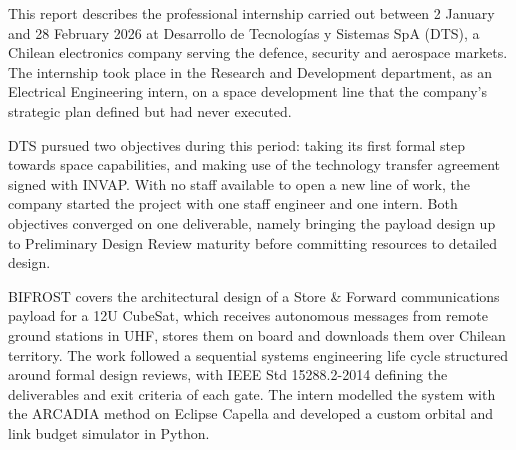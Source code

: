 %



This report describes the professional internship carried out between 2 January
and 28 February 2026 at Desarrollo de Tecnologías y Sistemas SpA (DTS), a
Chilean electronics company serving the defence, security and aerospace markets.
The internship took place in the Research and Development department, as an
Electrical Engineering intern, on a space development line that the
company's strategic plan defined but had never executed.

DTS pursued two objectives during this period: taking its first formal step
towards space capabilities, and making use of the technology transfer agreement
signed with INVAP. With no staff available to open a new line of work, the
company started the project with one staff engineer and one intern. Both objectives converged on one
deliverable, namely bringing the payload design up to Preliminary Design Review
maturity before committing resources to detailed design.

BIFROST covers the architectural design of a Store \& Forward communications
payload for a 12U CubeSat, which receives autonomous
messages from remote ground stations in UHF, stores them on board and downloads
them over Chilean territory. The work followed a sequential systems engineering
life cycle structured around formal design reviews, with IEEE Std 15288.2-2014
defining the deliverables and exit criteria of each gate. The intern modelled the
system with the ARCADIA method on Eclipse Capella and developed a custom orbital
and link budget simulator in Python.

